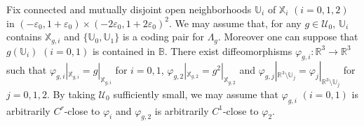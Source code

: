 \documentclass{amsart}
\theoremstyle{plain}
\theoremstyle{definition}
\theoremstyle{remark}
\numberwithin{equation}{section}
\def\xx{\mathbb{X}}
\def\uu{\mathbb{U}}
\begin{document}
Fix connected and mutually disjoint open neighborhoods $\mathbb{U}_i$ of 
$\xx_i$ $(i=0,1,2)$ in $(-\varepsilon_0,1+\varepsilon_0)\times (-2\varepsilon_0,1+2\varepsilon_0)^2$.
We may assume that, for any $g\in \mathcal{U}_0$, $\mathbb{U}_i$ contains $\xx_{g,i}$ and 
$\{\uu_0,\uu_1\}$ is a coding pair for $\Lambda_g$.
Moreover one can suppose that $g(\mathbb{U}_i)$ $(i=0,1)$ is contained in $\mathbb{B}$.
There exist diffeomorphisms $\varphi_{g,i}:\mathbb{R}^3\longrightarrow \mathbb{R}^3$ such that 
$\varphi_{g,i}|_{\xx_{g,i}}=g|_{\xx_{g,i}}$ for $i=0,1$, 
$\varphi_{g,2}|_{\xx_{g,2}}=g^2|_{\xx_{g,2}}$ 
and 
$\varphi_{g,j}|_{\mathbb{R}^3\setminus \mathbb{U}_j}=\varphi_j|_{\mathbb{R}^3\setminus \mathbb{U}_j}$ for $j=0,1,2$.
By taking $\mathcal{U}_0$ sufficiently small, we may assume that $\varphi_{g,i}$ $(i=0,1)$ is arbitrarily $C^r$-close to $\varphi_i$ and $\varphi_{g,2}$ is arbitrarily $C^1$-close to $\varphi_2$.
\end{document}
